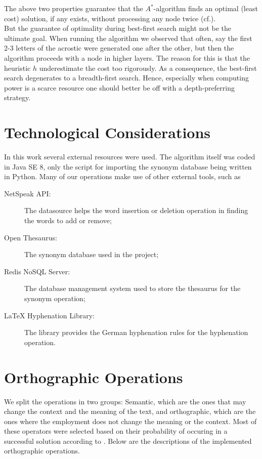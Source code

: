 \documentclass[11pt]{reportAlternative}
\begin{document}
The above two properties guarantee that the $A^*$-algorithm finds an optimal (least cost) solution, if any exists, without processing any node twice (cf.\cite{AstarAlgorithm}).\\
But the guarantee of optimality during best-first search might not be the ultimate goal.
When running the algorithm we observed that often, say the first 2-3 letters of the acrostic were generated one after the other, but then the algorithm proceeds with a node in higher layers. The reason for this is that the heuristic $h$ underestimate the cost too rigorously. As a consequence, the best-first search degenerates to a breadth-first search. Hence, especially when computing power is a scarce resource one should better be off with a depth-preferring strategy.

\section{Technological Considerations}
In this work several external resources were used. The algorithm itself was coded in Java SE 8, only the script for importing the synonym database being written in Python. Many of our operations make use of other external tools, such as
\begin{description}
	\item[NetSpeak API:] The datasource helps the word insertion or deletion operation in finding the words to add or remove;
	\item[Open Thesaurus:] The synonym database used in the project;
	\item[Redis NoSQL Server:] The database management system used to store the thesaurus for the synonym operation;
	\item[LaTeX Hyphenation Library:] The library provides the German hyphenation rules for the hyphenation operation.
\end{description}

\section{Orthographic Operations}
We split the operations in two groups: Semantic, which are the ones that may change the context and the meaning of the text, and orthographic, which are the ones where the employment does not change the meaning or the context. Most of these operators were selected based on their probability of occuring in a successful solution according to \cite[p.~2025]{Stein}. Below are the descriptions of the implemented orthographic operations.
\end{document}
